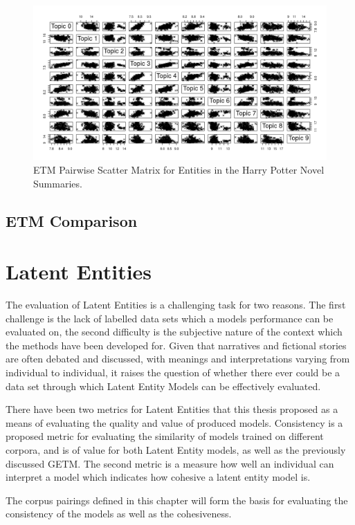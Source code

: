 \documentclass[10pt]{report}
\begin{document}
\begin{figure}[h!]
  \centering
  \includegraphics[scale=0.5]{hp_etms_summary}
  \caption{ETM Pairwise Scatter Matrix for Entities in the Harry Potter Novel Summaries.\label{fig:hp_summary_etm}}
\end{figure}

\clearpage
\subsection{ETM Comparison}

\clearpage
\section{Latent Entities}
The evaluation of Latent Entities is a challenging task for two reasons. The first challenge is the lack of labelled data sets which a models performance can be evaluated on, the second difficulty is the subjective nature of the context which the methods have been developed for. Given that narratives and fictional stories are often debated and discussed, with meanings and interpretations varying from individual to individual, it raises the question of whether there ever could be a data set through which Latent Entity Models can be effectively evaluated.

There have been two metrics for Latent Entities that this thesis proposed as a means of evaluating the quality and value of produced models. Consistency is a proposed metric for evaluating the similarity of models trained on different corpora, and is of value for both Latent Entity models, as well as the previously discussed GETM. The second metric is a measure how well an individual can interpret a model which indicates how cohesive a latent entity model is.

The corpus pairings defined in this chapter will form the basis for evaluating the consistency of the models as well as the cohesiveness. 
\end{document}
